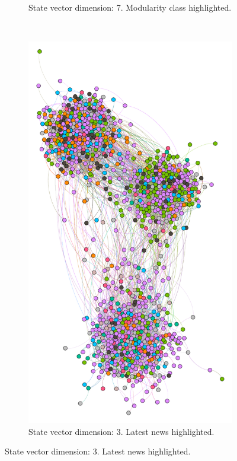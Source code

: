 \begin{figure}
\begin{subfigure}[t]{0.35\textwidth}
    \caption{State vector dimension: 7.
      Modularity class highlighted.}
    \label{fig:bubble7mod}
  \end{subfigure}
  \\
  \begin{subfigure}[t]{0.25\textwidth}
    \includegraphics[width=\textwidth]{img/dim3_news.pdf}
    \caption{State vector dimension: 3.
      Latest news highlighted.}

\end{subfigure}
\end{figure}
